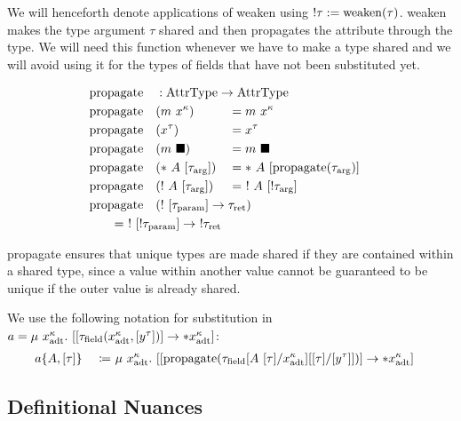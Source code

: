 We will henceforth denote applications of weaken using $!\tau := \mathrm{weaken}(\tau)$. weaken makes the type argument $\tau$ shared and then propagates the attribute through the type. We will need this function whenever we have to make a type shared and we will avoid using it for the types of fields that have not been substituted yet.

\newcommand{\propagate}{\mathrm{propagate}}

\begin{alignat*}{3}
  &\propagate &&: \mathrlap{\AttrType \to \AttrType} \\
  &\propagate&&(m\ x^\kappa) &&= m\ x^\kappa \\
  &\propagate&&(x^\tau) &&= x^\tau \\
  &\propagate&&(m\ \blacksquare) &&= m\ \blacksquare \\
  &\propagate&&(*\ A\ [\tau_\arrg]) &&= *\ A\ [\propagate(\tau_\arrg)] \\
  &\propagate&&(!\ A\ [\tau_\arrg]) &&= \ !\ A\ [!\tau_\arrg] \\
  &\propagate&&\mathrlap{(!\ [\tau_\param] \to \tau_\ret)} \\
  &\rebreak{= \ !\ [!\tau_\param] \to\ !\tau_\ret}
\end{alignat*}

propagate ensures that unique types are made shared if they are contained within a shared type, since a value within another value cannot be guaranteed to be unique if the outer value is already shared. 

We use the following notation for substitution in $a = \mu\ x^\kappa_\adt.\ [[\tau_\field(x^\kappa_\adt, [y^\tau])] \to *x^\kappa_\adt]$:
\begin{alignat*}{3}
	a\{A, [\tau]\}\ &&\coloneqq&\ \mu\ x^\kappa_\adt.\ [[\propagate(\tau_\field[A\ [\tau]/x^\kappa_\adt][[\tau]/[y^\tau]])] \to *x^\kappa_\adt]
\end{alignat*}

\subsection{Definitional Nuances}

